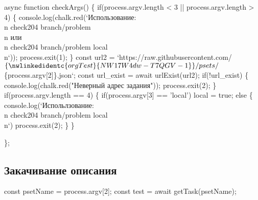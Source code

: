 \nwenddocs{}\endmoddef\nwstartdeflinemarkup{}\nwenddeflinemarkup
async function checkArgs() 
\{
        if(process.argv.length < 3 || process.argv.length > 4)
        \{
                console.log(chalk.red(`Использование: \\n 
                        check204 branch/problem \\n
                        или\\n
                        check204 branch/problem local\\n`));
                process.exit(1); 
        \}
        const url2 = `https://raw.githubusercontent.com/$\{\nwlinkedidentc{orgTest}{NW17W4dw-T7QGV-1}\}/psets/$\{process.argv[2]\}.json`;
        const url_exist = await urlExist(url2);
        if(!url_exist)
        \{
                console.log(chalk.red("Неверный адрес задания"));
                process.exit(2);
        \}
        if(process.argv.length == 4)
        \{
                if(process.argv[3] == 'local')
                        local = true;
                else
                \{
                        console.log(`Испольлзование: \\n
                                check204 branch/problem local\\n`)
                        process.exit(2);
                \}
        \}
                
\};

\nwendcode{}\nwdocspar

\subsection{Закачивание описания}
\nwenddocs{}\endmoddef\nwstartdeflinemarkup{}\nwenddeflinemarkup
        const psetName = process.argv[2];
        const test = await getTask(psetName); 
\nwendcode{}\nwdocspar

